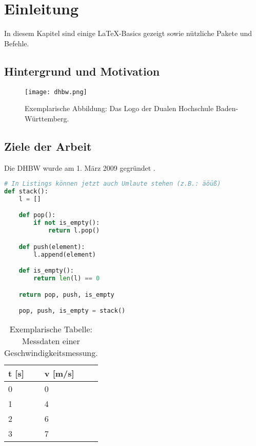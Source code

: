 
\chapter{Einleitung}

In diesem Kapitel sind einige LaTeX-Basics gezeigt sowie nützliche Pakete und Befehle.

\section{Hintergrund und Motivation}

\begin{figure}[ht]
    \centering
    \texttt{[image: dhbw.png]}
    \caption{Exemplarische Abbildung: Das Logo der Dualen Hochschule Baden-Württemberg.}
\end{figure}

\section{Ziele der Arbeit}

Die \ac{DHBW} wurde am 1. März 2009 gegründet \cite{DHBW-wirueberuns}.

\begin{minipage}{\linewidth}
\begin{lstlisting}[language=Python, caption={Exemplarisches Code-Listing: Beispielcode aus \href{https://de.wikipedia.org/wiki/Python_(Programmiersprache)}{Wikipedia}.}]
# In Listings können jetzt auch Umlaute stehen (z.B.: äöüß) 
def stack():
    l = []

    def pop():
        if not is_empty():
            return l.pop()

    def push(element):
        l.append(element)

    def is_empty():
        return len(l) == 0

    return pop, push, is_empty

    pop, push, is_empty = stack()
\end{lstlisting}
\end{minipage}

\begin{table}[ht]
    \centering
    \begin{tabular}{|l|l|}
        \hline
        t {[}s{]} & v {[}m/s{]} \\ \hline
        0         & 0           \\ \hline
        1         & 4           \\ \hline
        2         & 6           \\ \hline
        3         & 7           \\ \hline
    \end{tabular}
    \caption{Exemplarische Tabelle: Messdaten einer Geschwindigkeitsmessung.}
\end{table}

